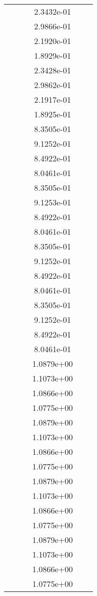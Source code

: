 \begin{xltabular}{\textwidth}{r|rS[table-format=1.3e+2]S[table-format=1.4e+2]S[table-format=1.4e+2]S[table-format=-1.5]}
&  &  & 2.3432e-01 & & \\
&  &  & 2.9866e-01 & & \\
&  &  & 2.1920e-01 & & \\
&  &  & 1.8929e-01 & & \\
&  &  & 2.3428e-01 & & \\
&  &  & 2.9862e-01 & & \\
&  &  & 2.1917e-01 & & \\
&  &  & 1.8925e-01 & & \\
&  &  & 8.3505e-01 & & \\
&  &  & 9.1252e-01 & & \\
&  &  & 8.4922e-01 & & \\
&  &  & 8.0461e-01 & & \\
&  &  & 8.3505e-01 & & \\
&  &  & 9.1253e-01 & & \\
&  &  & 8.4922e-01 & & \\
&  &  & 8.0461e-01 & & \\
&  &  & 8.3505e-01 & & \\
&  &  & 9.1252e-01 & & \\
&  &  & 8.4922e-01 & & \\
&  &  & 8.0461e-01 & & \\
&  &  & 8.3505e-01 & & \\
&  &  & 9.1252e-01 & & \\
&  &  & 8.4922e-01 & & \\
&  &  & 8.0461e-01 & & \\
&  &  & 1.0879e+00 & & \\
&  &  & 1.1073e+00 & & \\
&  &  & 1.0866e+00 & & \\
&  &  & 1.0775e+00 & & \\
&  &  & 1.0879e+00 & & \\
&  &  & 1.1073e+00 & & \\
&  &  & 1.0866e+00 & & \\
&  &  & 1.0775e+00 & & \\
&  &  & 1.0879e+00 & & \\
&  &  & 1.1073e+00 & & \\
&  &  & 1.0866e+00 & & \\
&  &  & 1.0775e+00 & & \\
&  &  & 1.0879e+00 & & \\
&  &  & 1.1073e+00 & & \\
&  &  & 1.0866e+00 & & \\
&  &  & 1.0775e+00 & & \\

\end{xltabular}

